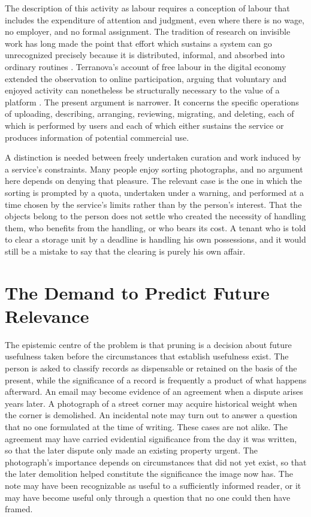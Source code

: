 \documentclass[12pt]{article}
\begin{document}
The description of this activity as labour requires a conception of labour that includes the expenditure of attention and judgment, even where there is no wage, no employer, and no formal assignment. The tradition of research on invisible work has long made the point that effort which sustains a system can go unrecognized precisely because it is distributed, informal, and absorbed into ordinary routines \cite{star1999,suchman1995}. Terranova's account of free labour in the digital economy extended the observation to online participation, arguing that voluntary and enjoyed activity can nonetheless be structurally necessary to the value of a platform \cite{terranova2000}. The present argument is narrower. It concerns the specific operations of uploading, describing, arranging, reviewing, migrating, and deleting, each of which is performed by users and each of which either sustains the service or produces information of potential commercial use.

A distinction is needed between freely undertaken curation and work induced by a service's constraints. Many people enjoy sorting photographs, and no argument here depends on denying that pleasure. The relevant case is the one in which the sorting is prompted by a quota, undertaken under a warning, and performed at a time chosen by the service's limits rather than by the person's interest. That the objects belong to the person does not settle who created the necessity of handling them, who benefits from the handling, or who bears its cost. A tenant who is told to clear a storage unit by a deadline is handling his own possessions, and it would still be a mistake to say that the clearing is purely his own affair.

\section{The Demand to Predict Future Relevance}

The epistemic centre of the problem is that pruning is a decision about future usefulness taken before the circumstances that establish usefulness exist. The person is asked to classify records as dispensable or retained on the basis of the present, while the significance of a record is frequently a product of what happens afterward. An email may become evidence of an agreement when a dispute arises years later. A photograph of a street corner may acquire historical weight when the corner is demolished. An incidental note may turn out to answer a question that no one formulated at the time of writing. These cases are not alike. The agreement may have carried evidential significance from the day it was written, so that the later dispute only made an existing property urgent. The photograph's importance depends on circumstances that did not yet exist, so that the later demolition helped constitute the significance the image now has. The note may have been recognizable as useful to a sufficiently informed reader, or it may have become useful only through a question that no one could then have framed.
\end{document}
